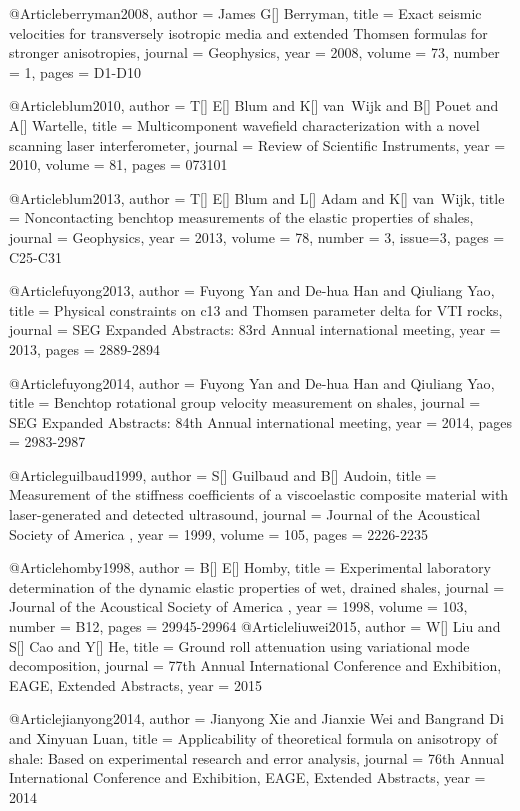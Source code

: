 @Article{berryman2008,
  author = 	 {James G[] Berryman},
  title = 	 {Exact seismic velocities for transversely isotropic media and extended Thomsen formulas for stronger anisotropies},
  journal = 	 {Geophysics},
  year = 	 2008,
  volume = 	 73,
  number = 	 1,
  pages = 	 {D1-D10}}

@Article{blum2010,
  author = 	 {T[] E[] Blum and K[] van~Wijk and B[] Pouet and A[] Wartelle},
  title = 	 {Multicomponent wavefield characterization with a novel scanning laser interferometer},
  journal = 	 {Review of Scientific Instruments},
  year = 	 2010,
  volume = 	 81,
  pages = 	 {073101}}

@Article{blum2013,
  author = 	 {T[] E[] Blum and L[] Adam and K[] van~Wijk},
  title = 	 {Noncontacting benchtop measurements of the elastic properties of shales},
  journal = 	 {Geophysics},
  year = 	 2013,
  volume = 	 78,
  number = 	 3,
  issue=3,
  pages = 	 {C25-C31}}

@Article{fuyong2013,
  author = 	 {Fuyong Yan and De-hua Han and Qiuliang Yao},
  title = 	 {Physical constraints on c13 and Thomsen parameter delta for VTI rocks},
  journal = 	 {SEG Expanded Abstracts: 83rd Annual international meeting},
  year = 	 2013,
  pages = 	 {2889-2894}}

@Article{fuyong2014,
  author = 	 {Fuyong Yan and De-hua Han and Qiuliang Yao},
  title = 	 {Benchtop rotational group velocity measurement on shales},
  journal = 	 {SEG Expanded Abstracts: 84th Annual international meeting},
  year = 	 2014,
  pages = 	 {2983-2987}}

@Article{guilbaud1999,
  author = 	 {S[] Guilbaud and B[] Audoin},
  title = 	 {Measurement of the stiffness coefficients of a viscoelastic composite material with laser-generated and detected ultrasound},
  journal = 	 { Journal of the Acoustical Society of America },
  year = 	 1999,
  volume = 	 105,
  pages = 	 {2226-2235}}

@Article{homby1998,
  author = 	 {B[] E[] Homby},
  title = 	 {Experimental laboratory determination of the dynamic elastic properties of wet, drained shales},
  journal = 	 { Journal of the Acoustical Society of America },
  year = 	 1998,
  volume = 	 103,
  number = B12,
  pages = 	 {29945-29964}}
@Article{liuwei2015,
  author = 	 {W[] Liu and S[] Cao and Y[] He},
  title = 	 {Ground roll attenuation using variational mode decomposition},
  journal = 	 { 77th Annual International Conference and Exhibition, EAGE, Extended Abstracts},
  year = 	 2015}

  
@Article{jianyong2014,
  author = 	 {Jianyong Xie and Jianxie Wei and Bangrand Di and Xinyuan Luan},
  title = 	 {Applicability of theoretical formula on anisotropy of shale: Based on experimental research and error analysis},
  journal = 	 { 76th Annual International Conference and Exhibition, EAGE, Extended Abstracts},
  year = 	 2014}

